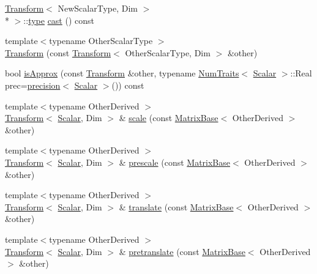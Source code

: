 \begin{DoxyCompactItemize}
\hyperlink{class_transform}{Transform}$<$ New\-Scalar\-Type, Dim $>$\\*
 $>$\-::\hyperlink{glext_8h_a7d05960f4f1c1b11f3177dc963a45d86}{type} \hyperlink{class_transform_affd0ce4c0d157550d1b32e5d02fc4ffa}{cast} () const 
\item 
{\footnotesize template$<$typename Other\-Scalar\-Type $>$ }\\\hyperlink{class_transform_a32ae9526d39a5413cc8f14ded92b21be}{Transform} (const \hyperlink{class_transform}{Transform}$<$ Other\-Scalar\-Type, Dim $>$ \&other)
\item 
bool \hyperlink{class_transform_a7db8f924357105f599d718e7a199c3b3}{is\-Approx} (const \hyperlink{class_transform}{Transform} \&other, typename \hyperlink{struct_num_traits}{Num\-Traits}$<$ \hyperlink{class_transform_a0468fefb805493a70f2100c7faf05489}{Scalar} $>$\-::Real prec=\hyperlink{_math_functions_8h_a3dc1c65cf9dc9b5a7ee66472d0ae83e1}{precision}$<$ \hyperlink{class_transform_a0468fefb805493a70f2100c7faf05489}{Scalar} $>$()) const 
\item 
{\footnotesize template$<$typename Other\-Derived $>$ }\\\hyperlink{class_transform}{Transform}$<$ \hyperlink{class_transform_a0468fefb805493a70f2100c7faf05489}{Scalar}, Dim $>$ \& \hyperlink{class_transform_af7c5d8b92e53e6e4be2fe23725414c26}{scale} (const \hyperlink{class_matrix_base}{Matrix\-Base}$<$ Other\-Derived $>$ \&other)
\item 
{\footnotesize template$<$typename Other\-Derived $>$ }\\\hyperlink{class_transform}{Transform}$<$ \hyperlink{class_transform_a0468fefb805493a70f2100c7faf05489}{Scalar}, Dim $>$ \& \hyperlink{class_transform_a8f7f2e066227216d88eda2ddce59abc2}{prescale} (const \hyperlink{class_matrix_base}{Matrix\-Base}$<$ Other\-Derived $>$ \&other)
\item 
{\footnotesize template$<$typename Other\-Derived $>$ }\\\hyperlink{class_transform}{Transform}$<$ \hyperlink{class_transform_a0468fefb805493a70f2100c7faf05489}{Scalar}, Dim $>$ \& \hyperlink{class_transform_a4fea0551c824a837efa9a2d60657eaec}{translate} (const \hyperlink{class_matrix_base}{Matrix\-Base}$<$ Other\-Derived $>$ \&other)
\item 
{\footnotesize template$<$typename Other\-Derived $>$ }\\\hyperlink{class_transform}{Transform}$<$ \hyperlink{class_transform_a0468fefb805493a70f2100c7faf05489}{Scalar}, Dim $>$ \& \hyperlink{class_transform_a930496f787a81b999c7e5df4071434ca}{pretranslate} (const \hyperlink{class_matrix_base}{Matrix\-Base}$<$ Other\-Derived $>$ \&other)

\end{DoxyCompactItemize}
